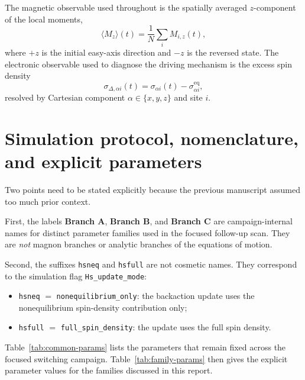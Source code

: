 \documentclass[11pt]{article}
\begin{document}
The magnetic observable used throughout is the spatially averaged \(z\)-component of the local moments,
\[
\langle M_z\rangle(t)=\frac{1}{N}\sum_i M_{i,z}(t),
\]
where \(+z\) is the initial easy-axis direction and \(-z\) is the reversed state. The electronic observable used to diagnose the driving mechanism is the excess spin density
\[
\sigma_{\Delta,\alpha i}(t)=\sigma_{\alpha i}(t)-\sigma^{\mathrm{eq}}_{\alpha i},
\]
resolved by Cartesian component \(\alpha\in\{x,y,z\}\) and site \(i\).

\section{Simulation protocol, nomenclature, and explicit parameters}
Two points need to be stated explicitly because the previous manuscript assumed too much prior context.

First, the labels \textbf{Branch A}, \textbf{Branch B}, and \textbf{Branch C} are campaign-internal names for distinct parameter families used in the focused follow-up scan. They are \emph{not} magnon branches or analytic branches of the equations of motion.

Second, the suffixes \texttt{hsneq} and \texttt{hsfull} are not cosmetic names. They correspond to the simulation flag \texttt{Hs\_update\_mode}:
\begin{itemize}
\item \texttt{hsneq} \(=\) \texttt{nonequilibrium\_only}: the backaction update uses the nonequilibrium spin-density contribution only;
\item \texttt{hsfull} \(=\) \texttt{full\_spin\_density}: the update uses the full spin density.
\end{itemize}

Table~\ref{tab:common-params} lists the parameters that remain fixed across the focused switching campaign. Table~\ref{tab:family-params} then gives the explicit parameter values for the families discussed in this report.
\end{document}
